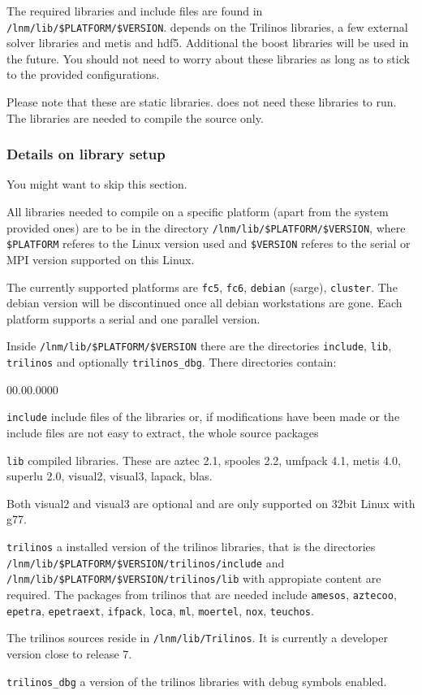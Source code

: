 The required libraries and include files are found in \texttt{/lnm/lib/\$PLATFORM/\$VERSION}.
\ccarat{} depends on the Trilinos libraries, a few external solver
libraries and metis and hdf5. Additional the boost libraries will be
used in the future. You should not need to worry about these libraries
as long as to stick to the provided configurations.

Please note that these are static libraries. \ccarat{} does not need
these libraries to run. The libraries are needed to compile the source
only.


\subsubsection{Details on library setup}

You might want to skip this section.

All libraries needed to compile \ccarat{} on a specific platform
(apart from the system provided ones) are to be in the directory \texttt{/lnm/lib/\$PLATFORM/\$VERSION},
where \texttt{\$PLATFORM} referes to the Linux version used and \texttt{\$VERSION}
referes to the serial or MPI version supported on this Linux.

The currently supported platforms are \texttt{fc5}, \texttt{fc6},
\texttt{debian} (sarge), \texttt{cluster}. The debian version will
be discontinued once all debian workstations are gone. Each platform
supports a serial and one parallel version.

Inside \texttt{/lnm/lib/\$PLATFORM/\$VERSION} there are the directories
\texttt{include}, \texttt{lib}, \texttt{trilinos} and optionally \texttt{trilinos\_dbg}.
There directories contain:

\begin{lyxlist}{00.00.0000}
\item [{\texttt{include}}] include files of the libraries or, if modifications
have been made or the include files are not easy to extract, the whole
source packages
\item [{\texttt{lib}}] compiled libraries. These are aztec 2.1, spooles
2.2, umfpack 4.1, metis 4.0, superlu 2.0, visual2, visual3, lapack,
blas.


Both visual2 and visual3 are optional and are only supported on 32bit
Linux with g77. 

\item [{\texttt{trilinos}}] a installed version of the trilinos libraries,
that is the directories \texttt{/lnm/lib/\$PLATFORM/\$VERSION/trilinos/include}
and \texttt{/lnm/lib/\$PLATFORM/\$VERSION/trilinos/lib} with appropiate
content are required. The packages from trilinos that are needed include
\texttt{amesos}, \texttt{aztecoo}, \texttt{epetra}, \texttt{epetraext},
\texttt{ifpack}, \texttt{loca}, \texttt{ml}, \texttt{moertel}, \texttt{nox},
\texttt{teuchos}. 


The trilinos sources reside in \texttt{/lnm/lib/Trilinos}. It is currently
a developer version close to release 7.

\item [{\texttt{trilinos\_dbg}}] a version of the trilinos libraries with
debug symbols enabled.
\end{lyxlist}


